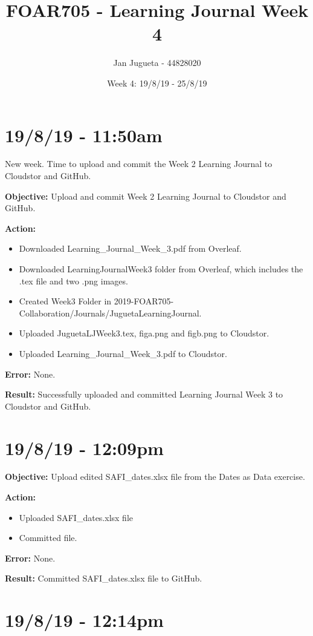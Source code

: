 \documentclass{article}
\title{FOAR705 - Learning Journal Week 4}
\author{Jan Jugueta - 44828020}
\date{Week 4: 19/8/19 - 25/8/19}
\begin{document}
\maketitle

\section*{19/8/19 - 11:50am}

New week. Time to upload and commit the Week 2 Learning Journal to Cloudstor and GitHub.

\textbf{Objective:} Upload and commit Week 2 Learning Journal to Cloudstor and GitHub.

\textbf{Action:} 
\begin{itemize}
    \item Downloaded Learning\_Journal\_Week\_3.pdf from Overleaf.
    \item Downloaded LearningJournalWeek3 folder from Overleaf, which includes the .tex file and two .png images.
    \item Created Week3 Folder in 2019-FOAR705-Collaboration/Journals/JuguetaLearningJournal.
    \item Uploaded JuguetaLJWeek3.tex, figa.png and figb.png to Cloudstor.
    \item Uploaded Learning\_Journal\_Week\_3.pdf to Cloudstor.
\end{itemize}

\textbf{Error:} None.

\textbf{Result:} Successfully uploaded and committed Learning Journal Week 3 to Cloudstor and GitHub.

\section*{19/8/19 - 12:09pm}

\textbf{Objective:} Upload edited SAFI\_dates.xlsx file from the Dates as Data exercise.

\textbf{Action:} 
\begin{itemize}
    \item Uploaded SAFI\_dates.xlsx file
    \item Committed file.
\end{itemize}

\textbf{Error:} None.

\textbf{Result:} Committed SAFI\_dates.xlsx file to GitHub.

\section*{19/8/19 - 12:14pm}
\end{document}
